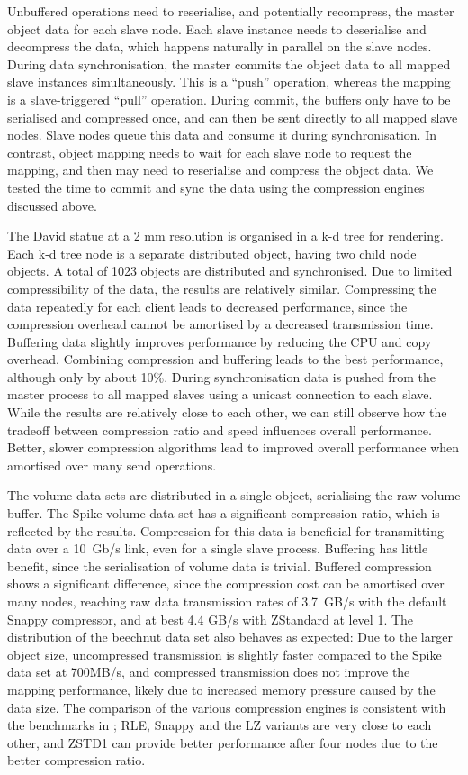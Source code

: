 Unbuffered operations need to reserialise, and potentially recompress, the
master object data for each slave node. Each slave instance needs to
deserialise and decompress the data, which happens naturally in parallel on the
slave nodes. During data synchronisation, the master commits the object data to
all mapped slave instances simultaneously. This is a “push” operation, whereas
the mapping is a slave-triggered “pull” operation. During commit, the buffers
only have to be serialised and compressed once, and can then be sent directly
to all mapped slave nodes. Slave nodes queue this data and consume it during
synchronisation. In contrast, object mapping needs to wait for each slave node
to request the mapping, and then may need to reserialise and compress the
object data. We tested the time to commit and sync the data using the compression
engines discussed above.

The David statue at a 2 mm resolution is organised in a k-d tree for rendering.
Each k-d tree node is a separate distributed object, having two child node
objects. A total of 1023 objects are distributed and synchronised. Due to
limited compressibility of the data, the results are relatively similar.
Compressing the data repeatedly for each client leads to decreased performance,
since the compression overhead cannot be amortised by a decreased
transmission time. Buffering data slightly improves performance by reducing the
CPU and copy overhead. Combining compression and buffering leads to the best
performance, although only by about 10\%. During synchronisation data is
pushed from the master process to all mapped slaves using a unicast connection
to each slave. While the results are relatively close to each other, we can
still observe how the tradeoff between compression ratio and speed influences
overall performance. Better, slower compression algorithms lead to improved
overall performance when amortised over many send operations.

The volume data sets are distributed in a single object, serialising the raw
volume buffer. The Spike volume data set has a significant compression ratio,
which is reflected by the results. Compression for this data is beneficial for
transmitting data over a 10~Gb/s link, even for a single slave process.
Buffering has little benefit, since the serialisation of volume data is trivial.
Buffered compression shows a significant difference, since the compression cost
can be amortised over many nodes, reaching raw data transmission rates of 3.7~GB/s with the default Snappy compressor, and at best 4.4 GB/s with ZStandard at
level 1. The distribution of the beechnut data set also behaves as expected:
Due to the larger object size, uncompressed transmission is slightly faster
compared to the Spike data set at 700MB/s, and compressed transmission does not
improve the mapping performance, likely due to increased memory pressure caused
by the data size. The comparison of the various compression engines is
consistent with the benchmarks in ; RLE, Snappy and the
LZ variants are very close to each other, and ZSTD1 can provide better
performance after four nodes due to the better compression ratio.

